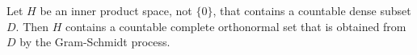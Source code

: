 Let $H$ be an inner product space, not $\{0\}$, that contains a countable dense subset $D$. Then $H$ contains a countable complete orthonormal set that is obtained from $D$ by the Gram-Schmidt process.